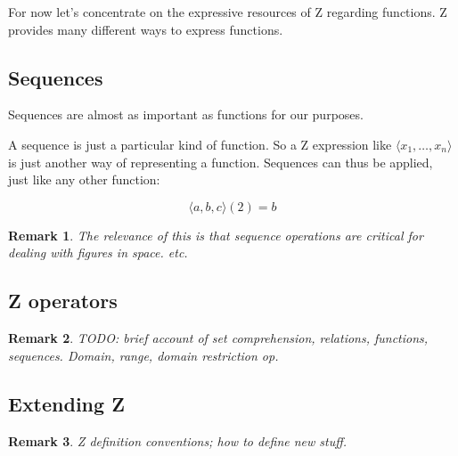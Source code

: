 \documentclass[12pt]{tufte-handout}
\numberwithin{equation}{subsection}
\numberwithin{equation}{subsection}
\newtheorem{remark}{Remark}
\begin{document}
For now let's concentrate on the expressive resources of Z regarding
functions.  Z provides many different ways to express functions.

\subsection{Sequences}
\label{sect:seqs}

Sequences are almost as important as functions for our purposes.

A sequence is just a particular kind of function.  So a Z expression
like \(\langle x_1,\ldots,x_n\rangle\) is just another way of
representing a function.  Sequences can thus be applied, just like
any other function:

\[\langle a,b,c\rangle(2) = b\]

\begin{remark}
  The relevance of this is that sequence operations are critical for dealing with figures in space. etc.
\end{remark}

\subsection{Z operators}
\label{subs:zops}

\begin{remark}
  TODO: brief account of set comprehension, relations, functions,
  sequences.  Domain, range, domain restriction op.
\end{remark}

\subsection{Extending Z}
\label{sect:zdefns}

\begin{remark}
  Z definition conventions; how to define new stuff.
\end{remark}
\end{document}
